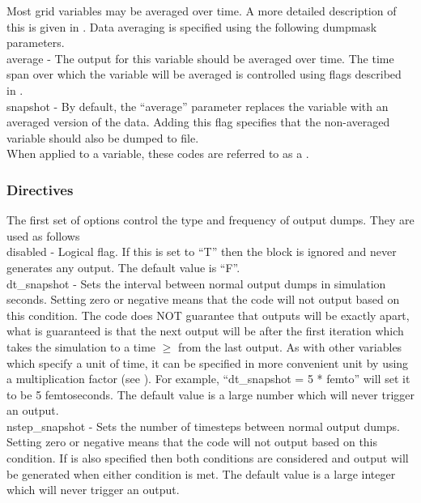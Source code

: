 Most grid variables may be averaged over time. A more detailed description
of this is given in . Data averaging is specified using
the following dumpmask parameters.\\

{\emphtext average} - The output for this variable should be averaged over
time. The time span over which the variable will be averaged is controlled
using flags described in .\\

{\emphtext snapshot} - By default, the ``average'' parameter replaces the
variable with an averaged version of the data. Adding this flag specifies
that the non-averaged variable should also be dumped to file.\\

When applied to a variable, these codes are referred to as a
.

\subsubsection{Directives}
\label{sec:output_directives}
The first set of options control the type and frequency of output dumps. They
are used as follows\\

{\emphtext disabled} - Logical flag. If this is set to ``T'' then the block
is ignored and never generates any output. The default value is ``F''.\\

{\emphtext dt\_snapshot} - Sets the interval between normal output dumps in
simulation seconds. Setting zero or negative means that the code will not output
based on this condition. The code does NOT guarantee that outputs will be
exactly  apart, what is guaranteed is that the next
output will be after the first iteration which takes the simulation to a time
$\ge$  from the last output.
As with other variables which specify a unit of time, it can be specified
in more convenient unit by using a multiplication factor (see
). For example, ``dt\_snapshot = 5 * femto'' will set
it to be 5 femtoseconds.
The default value is a large number which will never trigger an output.\\

{\emphtext nstep\_snapshot} - Sets the number of timesteps between normal
output dumps. Setting zero or negative means that the code will not output
based on this condition. If  is also specified
then both conditions are considered and output will be generated when either
condition is met. The default value is a large integer
which will never trigger an output.\\

